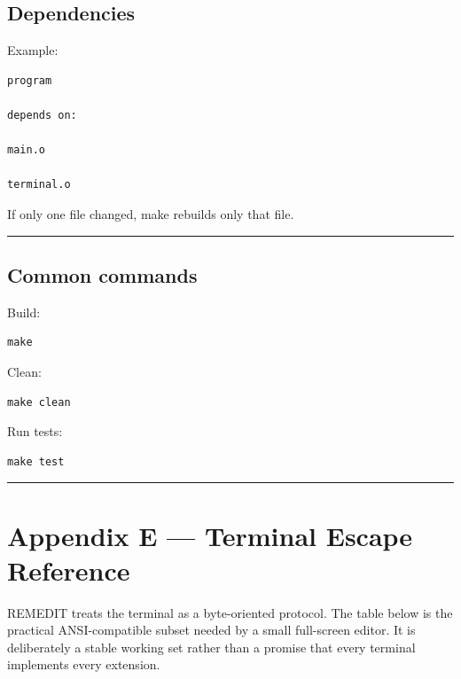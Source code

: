 \documentclass[
  oneside,
  openany]{book}
\begin{document}
\hypertarget{dependencies}{%
\section{Dependencies}\label{dependencies}}

Example:

\begin{verbatim}
program

depends on:

main.o

terminal.o
\end{verbatim}

If only one file changed, make rebuilds only that file.

\begin{center}\rule{0.5\linewidth}{0.5pt}\end{center}

\hypertarget{common-commands}{%
\section{Common commands}\label{common-commands}}

Build:

\begin{verbatim}
make
\end{verbatim}

Clean:

\begin{verbatim}
make clean
\end{verbatim}

Run tests:

\begin{verbatim}
make test
\end{verbatim}

\begin{center}\rule{0.5\linewidth}{0.5pt}\end{center}

\hypertarget{appendix-e-terminal-escape-reference}{%
\chapter{Appendix E --- Terminal Escape
Reference}\label{appendix-e-terminal-escape-reference}}

REMEDIT treats the terminal as a byte-oriented protocol. The table below
is the practical ANSI-compatible subset needed by a small full-screen
editor. It is deliberately a stable working set rather than a promise
that every terminal implements every extension.
\end{document}
